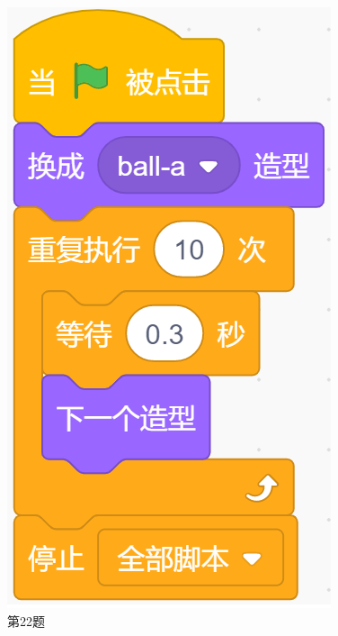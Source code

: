 \documentclass[10pt, a4paper]{article}
\begin{document}
\begin{enumerate}
\begin{figure}[htbp]
\begin{minipage}[t]{.14\textwidth}
                \caption*{第22题}
            \end{minipage}
            \begin{minipage}[t]{.25\textwidth}
                \centering
                \begin{minipage}[t]{.5\textwidth}
                    \centering
                    \includegraphics[width=\textwidth]{23-1.png}
                \end{minipage}

\end{minipage}
\end{figure}
\end{enumerate}
\end{document}
